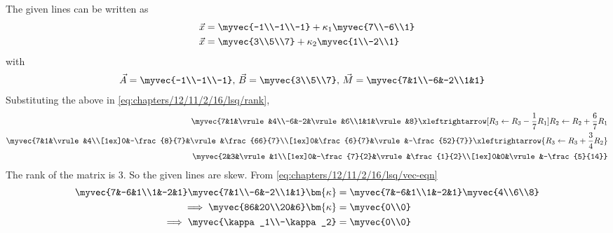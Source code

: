  The given lines  can be written as
\begin{align}
\label{eq:chapters/12/11/2/15/lines}
\begin{split}
\vec{x} &= \myvec{-1\\-1\\-1} + \kappa_1\myvec{7\\-6\\1}\\
\vec{x} &= \myvec{3\\5\\7} + \kappa_2\myvec{1\\-2\\1} 
\end{split}
\end{align}
with
\begin{align}
\vec{A} = \myvec{-1\\-1\\-1},\, \vec{B} &= \myvec{3\\5\\7},\,
\vec{M} = \myvec{7&1\\-6&-2\\1&1}
\end{align}
%
Substituting the above in 
	    \eqref{eq:chapters/12/11/2/16/lsq/rank},
\begin{align}
\myvec{7&1&\vrule&4\\-6&-2&\vrule&6\\1&1&\vrule&8}
\xleftrightarrow[R_3 \leftarrow R_3 - \frac{1}{7}R_1]{R_2 \leftarrow R_2 + \frac{6}{7}R_1}\\
	\myvec{7&1&\vrule&4\\[1ex]0&-\frac{8}{7}&\vrule&\frac{66}{7}\\[1ex]0&\frac{6}{7}&\vrule&-\frac{52}{7}}
\xleftrightarrow{R_3 \leftarrow R_3 + \frac{3}{4}R_2}\\
\myvec{2&3&\vrule&1\\[1ex]0&-\frac{7}{2}&\vrule&\frac{1}{2}\\[1ex]0&0&\vrule&-\frac{5}{14}}
\end{align}
The rank of the matrix is 3. So the given lines are skew.
        From \eqref{eq:chapters/12/11/2/16/lsq/vec-eqn}
\begin{align}
\myvec{7&-6&1\\1&-2&1} \myvec{7&1\\-6&-2\\1&1}\bm{\kappa} &= \myvec{7&-6&1\\1&-2&1} \myvec{4\\6\\8}\\
\implies \myvec{86&20\\20&6}\bm{\kappa} &= \myvec{0\\0}
\label{eq:chapters/12/11/2/15/3}
\\
\implies \myvec{\kappa_1\\-\kappa_2} &= \myvec{0\\0}
\end{align}
